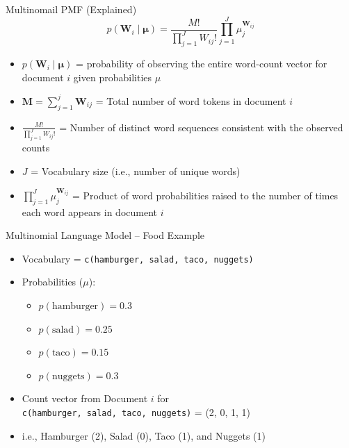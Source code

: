 \documentclass[
  ignorenonframetext,
  aspectratio=169]{beamer}
\begin{document}
\begin{frame}{Multinomail PMF (Explained)}
\label{multinomail-pmf-explained}
\[
p(\mathbf{W}_i \mid \boldsymbol{\mu}) = 
\frac{M!}{\prod_{j=1}^J W_{ij}!} \prod_{j=1}^J
\mu_{j}^{\mathbf{W}_{ij}}
\]

\begin{itemize}
\item $p(\mathbf{W}_i \mid \boldsymbol{\mu})$ = probability of observing the entire word-count vector for document $i$ given probabilities $\mu$
\item $\mathbf{M} = \sum_{j=1}^j\mathbf{W}_{ij}$ = Total number of word tokens in document $i$
\item $\frac{M!}{\prod_{j=1}^J W_{ij}!}$ = Number of distinct word sequences consistent with the observed counts
\item $J$ = Vocabulary size (i.e., number of unique words)
\item $\prod_{j=1}^J \mu_{j}^{\mathbf{W}_{ij}}$ = Product of word probabilities raised to the number of times each word appears in document $i$
\end{itemize}
\end{frame}

\begin{frame}{Multinomial Language Model -- Food Example}
\label{multinomial-language-model-food-example}
\begin{itemize}
\item Vocabulary = \texttt{c(hamburger, salad, taco, nuggets)} \par \vspace{2.5mm}
\item Probabilities ($\mu$): 
  \begin{itemize}
  \item $p(\text{hamburger}) = 0.3$
  \item $p(\text{salad}) = 0.25$
  \item $p(\text{taco}) = 0.15$
  \item $p(\text{nuggets}) = 0.3$
  \end{itemize} \par \vspace{2.5mm}
\item Count vector from Document $i$ for \\ \texttt{c(hamburger, salad, taco, nuggets)} =  (2, 0, 1, 1) 
\item i.e., Hamburger (2), Salad (0), Taco (1), and Nuggets (1)
\end{itemize}
\end{frame}
\end{document}
